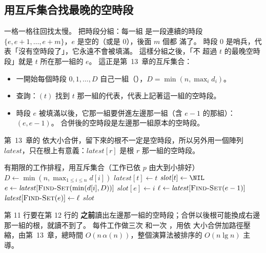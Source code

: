 \subsection{用互斥集合找最晚的空時段}
\label{sec:gr-dsu}

一格一格往回找太慢。 把時段分組：每一組
是一段連續的時段 $\{e, e + 1, \ldots, e + m\}$，$e$ 是空的（或是 $0$），後面 $m$ 個都
滿了。 時段 $0$ 是哨兵，代表「沒有空時段了」，它永遠不會被填滿。 這樣分組之後，「不
超過 $t$ 的最晚空時段」就是 $t$ 所在那一組的 $e$。 這正是第~13~章的互斥集合：

\begin{itemize}
\item 一開始每個時段 $0, 1, \ldots, D$ 自己一組（），$D = \min(n,
\max_i d_i)$。
\item 查詢：$(t)$ 找到 $t$ 那一組的代表，代表上記著這一組的空時段。
\item 時段 $e$ 被填滿以後，它那一組要併進左邊那一組（含 $e - 1$ 的那組）：
$(e, e - 1)$。 合併後的空時段是左邊那一組原本的空時段。
\end{itemize}

第~13~章的  依大小合併，留下來的根不一定是空時段，所以另外用一個陣列
$\mathit{latest}$，只在根上有意義：$\mathit{latest}[r]$ 是根 $r$ 那一組的空時段。

\begin{pseudo}[label=alg:gr-deadline-dsu, unbreakable]{有期限的工作排程，用互斥集合（工作已依 $p$ 由大到小排好）}
    \State $D \gets \min(n, \max_{1 \le i \le n} d[i])$
        \State {}
        \State $\mathit{latest}[t] \gets t$
        \State $\mathit{slot}[t] \gets \NIL$
    \EndFor
        \State $e \gets \mathit{latest}[\Call{Find-Set}{\min(d[i], D)}]$
         
            \State $\mathit{slot}[e] \gets i$
            \State $\ell \gets \mathit{latest}[\Call{Find-Set}{e - 1}]$ 
            \State {}
            \State $\mathit{latest}[\Call{Find-Set}{e}] \gets \ell$
        \EndIf
    \EndFor
    \State \Return $\mathit{slot}$
\EndFunction
\end{pseudo}

第 11 行要在第 12 行的  \textbf{之前}讀出左邊那一組的空時段；合併以後根可能換成右邊
那一組的根，就讀不到了。 每件工作做三次  和一次 ，用依
大小合併加路徑壓縮，由第~13~章，總時間 $O(n\,\alpha(n))$，整個演算法被排序的
$O(n \lg n)$ 主導。

